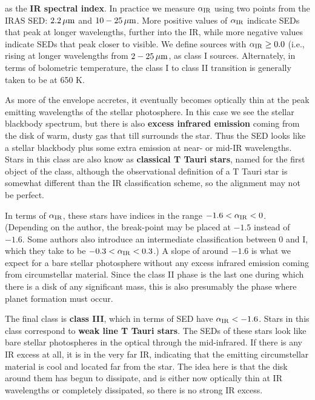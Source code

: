 \documentclass[a4paper,10pt]{article}
\begin{document}
{\noindent}as the \textbf{IR spectral index}. In practice we measure $\alpha_{\rm IR}$ using two points from the IRAS SED: $2.2\,\mu{\rm m}$ and $10-25\,\mu{\rm m}$. More positive values of $\alpha_{\rm IR}$ indicate SEDs that peak at longer wavelengths, further into the IR, while more negative values indicate SEDs that peak closer to visible. We define sources with $\alpha_{\rm IR}\geq0.0$ (i.e., rising at longer wavelengths from $2-25\,\mu{\rm m}$, as class I sources. Alternately, in terms of bolometric temperature, the class I to class II transition is generally taken to be at 650 K.

{\noindent}As more of the envelope accretes, it eventually becomes optically thin at the peak emitting wavelengths of the stellar photosphere. In this case we see the stellar blackbody spectrum, but there is also \textbf{excess infrared emission} coming from the disk of warm, dusty gas that till surrounds the star. Thus the SED looks like a stellar blackbody plus some extra emission at near- or mid-IR wavelengths. Stars in this class are also know as \textbf{classical T Tauri stars}, named for the first object of the class, although the observational definition of a T Tauri star is somewhat different than the IR classification scheme, so the alignment may not be perfect.

{\noindent}In terms of $\alpha_{\rm IR}$, these stars have indices in the range  $-1.6<\alpha_{\rm IR}<0$. (Depending on the author, the break-point may be placed at $-1.5$ instead of $-1.6$. Some authors also introduce an intermediate classification between 0 and I, which they take to be $-0.3<\alpha_{\rm IR}<0.3$.) A slope of around $-1.6$ is what we expect for a bare stellar photosphere without any excess infrared emission coming from circumstellar material. Since the class II phase is the last one during which there is a disk of any significant mass, this is also presumably the phase where planet formation must occur.

{\noindent}The final class is \textbf{class III}, which in terms of SED have $\alpha_{\rm IR}<-1.6$. Stars in this class correspond to \textbf{weak line T Tauri stars}. The SEDs of these stars look like bare stellar photospheres in the optical through the mid-infrared. If there is any IR excess at all, it is in the very far IR, indicating that the emitting circumstellar material is cool and located far from the star. The idea here is that the disk around them has begun to dissipate, and is either now optically thin at IR wavelengths or completely dissipated, so there is no strong IR excess.
\end{document}
